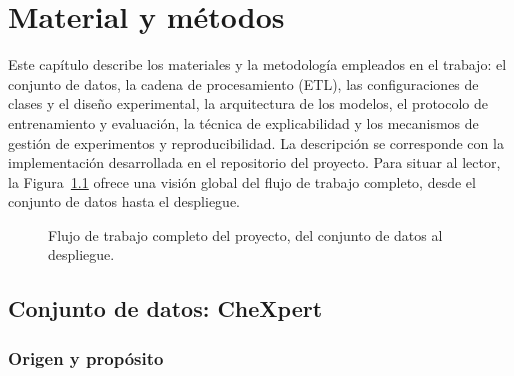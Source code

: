 %
\chapter{Material y métodos}
\label{sec::capitulo3}

Este capítulo describe los materiales y la metodología empleados en el trabajo:
el conjunto de datos, la cadena de procesamiento (ETL), las configuraciones de
clases y el diseño experimental, la arquitectura de los modelos, el protocolo de
entrenamiento y evaluación, la técnica de explicabilidad y los mecanismos de
gestión de experimentos y reproducibilidad. La descripción se corresponde con la
implementación desarrollada en el repositorio del proyecto. Para situar al lector, la
Figura~\ref{fig::mm_workflow} ofrece una visión global del flujo de trabajo completo,
desde el conjunto de datos hasta el despliegue.

\begin{figure}[ht]
\centering
{}
\caption{Flujo de trabajo completo del proyecto, del conjunto de datos al despliegue.}
\label{fig::mm_workflow}
\end{figure}


\section{Conjunto de datos: CheXpert}
\label{sec::mm_dataset}

\subsection{Origen y propósito}

